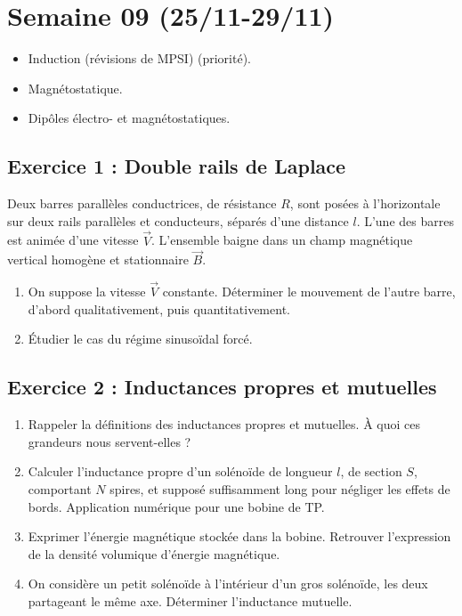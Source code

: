 \section{Semaine 09 (25/11-29/11) }

\begin{itemize}
	\item Induction (révisions de MPSI) (priorité).
	\item Magnétostatique.
	\item Dipôles électro- et magnétostatiques.
\end{itemize}

\subsection{Exercice 1 : Double rails de Laplace}

Deux barres parallèles conductrices, de résistance $R$, sont posées à l'horizontale sur deux rails parallèles et conducteurs, séparés d'une distance $l$. L'une des barres est animée d'une vitesse $\vec{V}$. L'ensemble baigne dans un champ magnétique vertical homogène et stationnaire $\vec{B}$. 

\begin{enumerate}
	\item On suppose la vitesse $\vec{V}$ constante. Déterminer le mouvement de l'autre barre, d'abord qualitativement, puis quantitativement.
	\item Étudier le cas du régime sinusoïdal forcé.
\end{enumerate}

\subsection{Exercice 2 : Inductances propres et mutuelles}

\begin{enumerate}
	\item Rappeler la définitions des inductances propres et mutuelles. À quoi ces grandeurs nous servent-elles ?
	\item Calculer l'inductance propre d'un solénoïde de longueur $l$, de section $S$, comportant $N$ spires, et supposé suffisamment long pour négliger les effets de bords. Application numérique pour une bobine de TP.
	\item Exprimer l'énergie magnétique stockée dans la bobine. Retrouver l'expression de la densité volumique d'énergie magnétique.
	\item On considère un petit solénoïde à l'intérieur d'un gros solénoïde, les deux partageant le même axe. Déterminer l'inductance mutuelle.
\end{enumerate}

